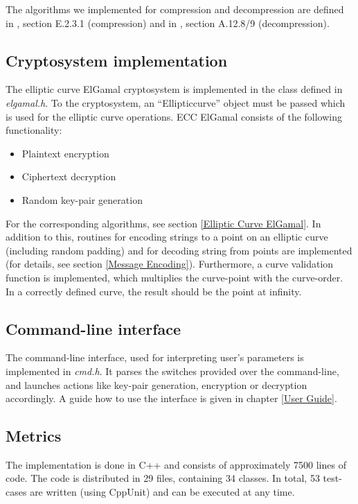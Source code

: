 \documentclass[11pt,english]{article}
\begin{document}
The algorithms we implemented for compression and decompression are defined in \cite{point-compress}, section E.2.3.1 (compression) and in \cite{point-decompress}, section A.12.8/9 (decompression).

\subsection{Cryptosystem implementation}
The elliptic curve ElGamal cryptosystem is implemented in the class defined in \emph{elgamal.h}. To the cryptosystem, an ``Ellipticcurve'' object must be passed which is used for the elliptic curve operations. ECC ElGamal consists of the following functionality:

\begin{itemize}
 \item Plaintext encryption
 \item Ciphertext decryption
 \item Random key-pair generation
\end{itemize}

For the corresponding algorithms, see section \ref{Elliptic Curve ElGamal}. In addition to this, routines for encoding strings to a point on an elliptic curve (including random padding) and for decoding string from points are implemented (for details, see section \ref{Message Encoding}). Furthermore, a curve validation function is implemented, which multiplies the curve-point with the curve-order. In a correctly defined curve, the result should be the point at infinity.

\subsection{Command-line interface}
The command-line interface, used for interpreting user's parameters is implemented in \emph{cmd.h}. It parses the switches provided over the command-line, and launches actions like key-pair generation, encryption or decryption accordingly. A guide how to use the interface is given in chapter \ref{User Guide}.

\subsection{Metrics}
The implementation is done in C++ and consists of approximately 7500 lines of code. The code is distributed in 29 files, containing 34 classes. In total, 53 test-cases are written (using CppUnit) and can be executed at any time.
\end{document}
